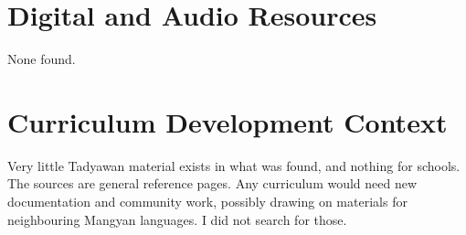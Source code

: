 \documentclass[12pt]{article}
\begin{document}
\section{Digital and Audio Resources}
None found.

\section{Curriculum Development Context}
Very little Tadyawan material exists in what was found, and nothing for schools. The sources are general reference pages. Any curriculum would need new documentation and community work, possibly drawing on materials for neighbouring Mangyan languages. I did not search for those.
\end{document}
